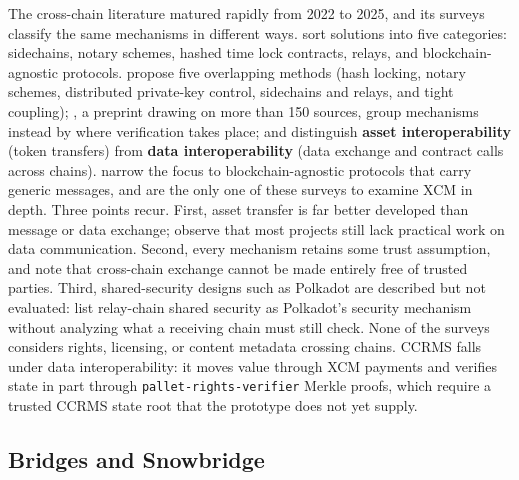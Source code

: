 The cross-chain literature matured rapidly from 2022 to 2025, and its surveys classify the same mechanisms in different ways. \citet{renEtAl2023} sort solutions into five categories: sidechains, notary schemes, hashed time lock contracts, relays, and blockchain-agnostic protocols. \citet{maoEtAl2022} propose five overlapping methods (hash locking, notary schemes, distributed private-key control, sidechains and relays, and tight coupling); \citet{dengEtAl2025}, a preprint drawing on more than 150 sources, group mechanisms instead by where verification takes place; and \citet{liEtAl2025a} distinguish \textbf{asset interoperability} (token transfers) from \textbf{data interoperability} (data exchange and contract calls across chains). \citet{bigiottiEtAl2025} narrow the focus to blockchain-agnostic protocols that carry generic messages, and are the only one of these surveys to examine XCM in depth. Three points recur. First, asset transfer is far better developed than message or data exchange; \citet{maoEtAl2022} observe that most projects still lack practical work on data communication. Second, every mechanism retains some trust assumption, and \citet{dengEtAl2025} note that cross-chain exchange cannot be made entirely free of trusted parties. Third, shared-security designs such as Polkadot are described but not evaluated: \citet{dengEtAl2025} list relay-chain shared security as Polkadot's security mechanism without analyzing what a receiving chain must still check. None of the surveys considers rights, licensing, or content metadata crossing chains. CCRMS falls under data interoperability: it moves value through XCM payments and verifies state in part through \texttt{pallet-rights-verifier} Merkle proofs, which require a trusted CCRMS state root that the prototype does not yet supply.
\subsection{Bridges and Snowbridge}\label{subsec:bridges-snowbridge}

